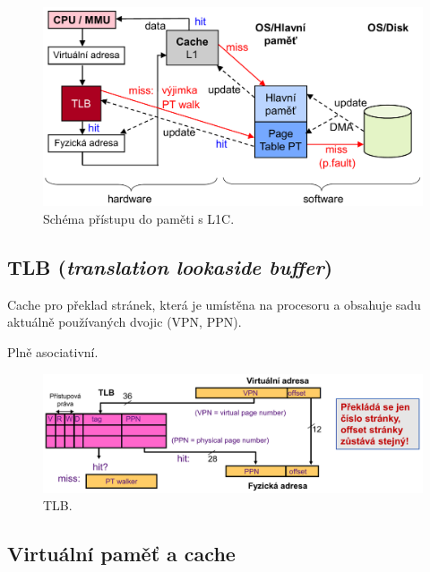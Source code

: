 \begin{compactitem}
    \begin{figure}[H]
        \centering
        \includegraphics[width=1\linewidth]{schema_pristupu_do_pameti.pdf}
        \caption{Schéma přístupu do paměti s L1C.}
    \end{figure}
\end{compactitem}

\subsection{TLB (\textit{translation lookaside buffer})}

\begin{compactitem}
    \item Cache pro překlad stránek, která je umístěna na procesoru a obsahuje sadu aktuálně používaných dvojic (VPN, PPN).

    \item Plně asociativní.

    \begin{figure}[H]
        \centering
        \includegraphics[width=1\linewidth]{tlb.pdf}
        \caption{TLB.}
    \end{figure}
\end{compactitem}

\subsection{Virtuální paměť a cache}

